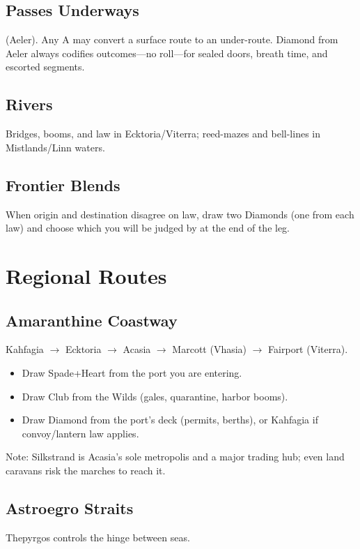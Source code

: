 \subsection{Passes Underways}
(Aeler). Any A may convert a surface route to an under-route. Diamond from Aeler always codifies outcomes---no roll---for sealed doors, breath time, and escorted segments.

\subsection{Rivers}
Bridges, booms, and law in Ecktoria/Viterra; reed-mazes and bell-lines in Mistlands/Linn waters.

\subsection{Frontier Blends}
When origin and destination disagree on law, draw two Diamonds (one from each law) and choose which you will be judged by at the end of the leg.

\section{Regional Routes}

\subsection{Amaranthine Coastway}
Kahfagia $\rightarrow$ Ecktoria $\rightarrow$ Acasia $\rightarrow$ Marcott (Vhasia) $\rightarrow$ Fairport (Viterra).

\begin{itemize}
\item Draw Spade+Heart from the port you are entering.
\item Draw Club from the Wilds (gales, quarantine, harbor booms).
\item Draw Diamond from the port's deck (permits, berths), or Kahfagia if convoy/lantern law applies.
\end{itemize}

Note: Silkstrand is Acasia's sole metropolis and a major trading hub; even land caravans risk the marches to reach it.

\subsection{Astroegro Straits}
Thepyrgos controls the hinge between seas.

